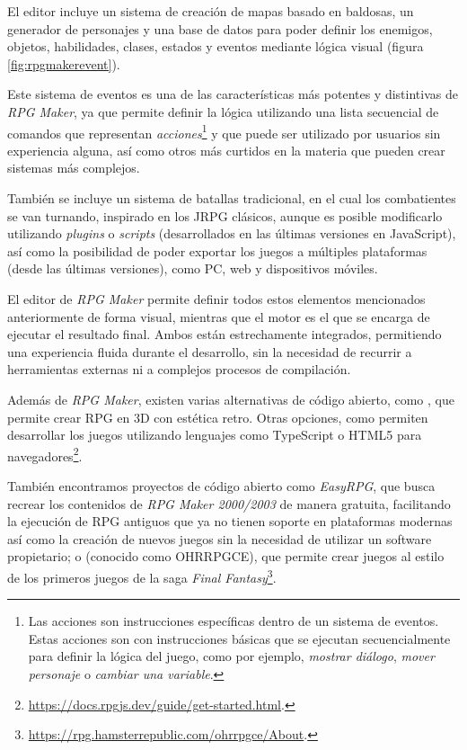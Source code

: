 \smallskip

El editor incluye un sistema de creación de mapas basado en baldosas, un generador de personajes y una base de datos para poder definir los enemigos, objetos, habilidades, clases, estados y eventos mediante lógica visual (figura \ref{fig:rpgmakerevent}). 

\medskip

Este sistema de eventos es una de las características más potentes y distintivas de \textit{RPG Maker}, ya que permite definir la lógica utilizando una lista secuencial de comandos que representan \textit{acciones}\footnote{Las acciones son instrucciones específicas dentro de un sistema de eventos. Estas acciones son  con instrucciones básicas que se ejecutan secuencialmente para definir la lógica del juego, como por ejemplo, \textit{mostrar diálogo}, \textit{mover personaje} o \textit{cambiar una variable}.} y que puede ser utilizado por usuarios sin experiencia alguna, así como otros más curtidos en la materia que pueden crear sistemas más complejos.

\medskip

También se incluye un sistema de batallas tradicional, en el cual los combatientes se van turnando, inspirado en los JRPG clásicos, aunque es posible modificarlo utilizando \textit{plugins} o \textit{scripts} (desarrollados en las últimas versiones en JavaScript), así como la posibilidad de poder exportar los juegos a múltiples plataformas (desde las últimas versiones), como PC, web y dispositivos móviles.

\medskip

El editor de \textit{RPG Maker} permite definir todos estos elementos mencionados anteriormente de forma visual, mientras que el motor es el que se encarga de ejecutar el resultado final. Ambos están estrechamente integrados, permitiendo una experiencia fluida durante el desarrollo, sin la necesidad de recurrir a herramientas externas ni a complejos procesos de compilación.

\bigskip

Además de \textit{RPG Maker}, existen varias alternativas de código abierto, como \cite{rpgpapermaker}, que permite crear RPG en 3D con estética retro. Otras opciones, como \cite{rpgjs} permiten desarrollar los juegos utilizando lenguajes como TypeScript o HTML5 para navegadores\footnote{\url{https://docs.rpgjs.dev/guide/get-started.html}.}.

\smallskip

También encontramos proyectos de código abierto como \textit{EasyRPG}, que busca recrear los contenidos de \textit{RPG Maker 2000/2003} de manera gratuita, facilitando la ejecución de RPG antiguos que ya no tienen soporte en plataformas modernas así como la creación de nuevos juegos sin la necesidad de utilizar un software propietario; o \cite{ohrrpgce} (conocido como OHRRPGCE), que permite crear juegos al estilo de los primeros juegos de la saga \textit{Final Fantasy}\footnote{\url{https://rpg.hamsterrepublic.com/ohrrpgce/About}.}.

